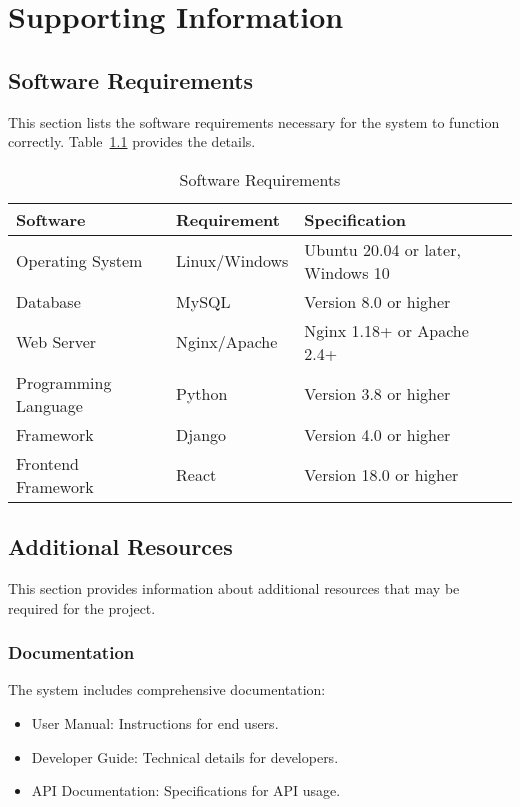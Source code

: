 \chapter{Supporting Information}
\label{ch:supporting_information}

\section{Software Requirements}
This section lists the software requirements necessary for the system to function correctly. Table~\ref{tab:software_requirements} provides the details.

\begin{table}[h]
    \centering
    \begin{tabular}{|l|l|l|}
        \hline
        \textbf{Software} & \textbf{Requirement} & \textbf{Specification} \\ \hline
        Operating System & Linux/Windows & Ubuntu 20.04 or later, Windows 10 \\ \hline
        Database & MySQL & Version 8.0 or higher \\ \hline
        Web Server & Nginx/Apache & Nginx 1.18+ or Apache 2.4+ \\ \hline
        Programming Language & Python & Version 3.8 or higher \\ \hline
        Framework & Django & Version 4.0 or higher \\ \hline
        Frontend Framework & React & Version 18.0 or higher \\ \hline
    \end{tabular}
    \caption{Software Requirements}
    \label{tab:software_requirements}
\end{table}

\section{Additional Resources}
This section provides information about additional resources that may be required for the project.

\subsection{Documentation}
The system includes comprehensive documentation:
\begin{itemize}
    \item User Manual: Instructions for end users.
    \item Developer Guide: Technical details for developers.
    \item API Documentation: Specifications for API usage.
\end{itemize}

